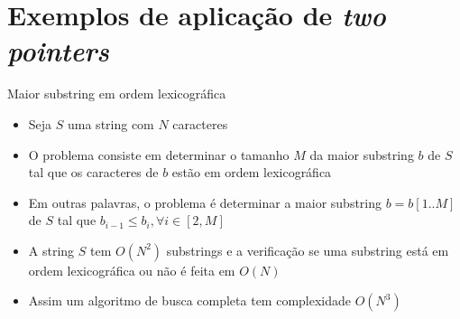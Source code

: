 \section{Exemplos de aplicação de {\it two pointers}}

\begin{frame}[fragile]{Maior substring em ordem lexicográfica}

    \begin{itemize}
        \item Seja $S$ uma string com $N$ caracteres

        \item O problema consiste em determinar o tamanho $M$ da maior substring $b$ de $S$ tal
            que os caracteres de $b$ estão em ordem lexicográfica

        \item Em outras palavras, o problema é determinar a maior substring $b=b[1..M]$ de
            $S$ tal que $b_{i - 1} \leq b_i, \forall i\in[2, M]$

        \item A string $S$ tem $O(N^2)$ substrings e a verificação se uma substring está em
            ordem lexicográfica ou não é feita em $O(N)$

        \item Assim um algoritmo de busca completa tem complexidade $O(N^3)$

    \end{itemize}

\end{frame}

